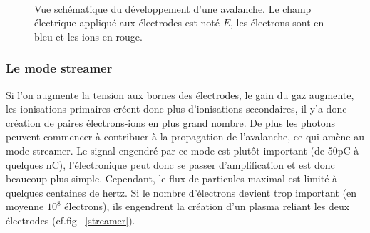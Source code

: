\begin{figure}[ht!]
\centering
{}
\hfill
{}
\\
\hfill
{}
\caption{Vue schématique du développement d'une avalanche. Le champ électrique appliqué aux électrodes est noté $E$, les électrons sont en bleu et les ions en rouge.}
\label{avalanche}
\end{figure}

\subsubsection{Le mode streamer}

Si l'on augmente la tension aux bornes des électrodes, le gain du gaz augmente, les ionisations primaires créent donc plus d'ionisations secondaires, il y'a donc création de paires électrons-ions  en plus grand nombre. De plus les photons peuvent commencer à contribuer à la propagation de l'avalanche, ce qui amène au mode streamer. Le signal engendré par ce mode est plutôt important (de 50pC à quelques nC), l'électronique peut donc se passer d'amplification et est donc beaucoup plus simple. Cependant, le flux de particules maximal est limité à quelques centaines de hertz. Si le nombre d'électrons devient trop important (en moyenne $10^{8}$ électrons), ils engendrent la création d'un plasma reliant les deux électrodes (cf.fig~ \ref{streamer}).

